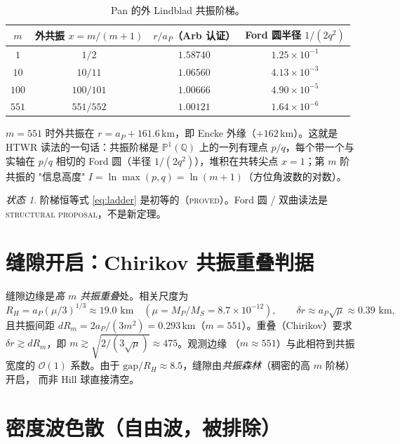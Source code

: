 \documentclass[11pt]{ctexart}
\theoremstyle{remark}
\newtheorem*{status}{状态}
\newcommand{\Q}{\mathbb{Q}}
\newcommand{\PP}{\mathbb{P}}
\begin{document}
\begin{table}[ht]
\centering
\begin{tabular}{c c c c}
\toprule
$m$ & 外共振 $x=m/(m+1)$ & $r/a_P$（Arb 认证） & Ford 圆半径 $1/(2q^2)$\\
\midrule
$1$ & $1/2$ & $1.58740$ & $1.25\times10^{-1}$\\
$10$ & $10/11$ & $1.06560$ & $4.13\times10^{-3}$\\
$100$ & $100/101$ & $1.00666$ & $4.90\times10^{-5}$\\
$551$ & $551/552$ & $1.00121$ & $1.64\times10^{-6}$\\
\bottomrule
\end{tabular}
\caption{Pan 的外 Lindblad 共振阶梯。}
\label{tab:ladder}
\end{table}

$m=551$ 时外共振在 $r=a_P+161.6$\,km，即 Encke 外缘（$+162$\,km）。这就是 HTWR
读法的一句话：共振阶梯是 $\PP^1(\Q)$ 上的一列有理点 $p/q$，每个带一个与实轴在
$p/q$ 相切的 Ford 圆（半径 $1/(2q^2)$），堆积在共转尖点 $x=1$；第 $m$ 阶共振的
"信息高度" $I=\ln\max(p,q)=\ln(m+1)$（方位角波数的对数）。

\begin{status}
阶梯恒等式 \eqref{eq:ladder} 是初等的（\textsc{proved}）。Ford 圆 / 双曲读法是
\textsc{structural proposal}，不是新定理。
\end{status}

\section{缝隙开启：Chirikov 共振重叠判据}\label{sec:chirikov}

缝隙边缘是\emph{高 $m$ 共振重叠}处。相关尺度为
\begin{equation}\label{eq:scales}
R_H=a_P(\mu/3)^{1/3}\approx19.0\text{ km}
\quad(\mu=M_P/M_S=8.7\times10^{-12}),\qquad
\delta r\approx a_P\sqrt\mu\approx0.39\text{ km},
\end{equation}
且共振间距 $dR_m=2a_P/(3m^2)=0.293$\,km（$m=551$）。重叠（Chirikov）要求
$\delta r\gtrsim dR_m$，即 $m\gtrsim\sqrt{2/(3\sqrt\mu)}\approx475$。观测边缘
（$m\approx551$）与此相符到共振宽度的 $\mathcal O(1)$ 系数。由于
$\mathrm{gap}/R_H\approx8.5$，缝隙由\emph{共振森林}（稠密的高 $m$ 阶梯）开启，
而非 Hill 球直接清空。

\section{密度波色散（自由波，被排除）}\label{sec:dispersion}
\end{document}

